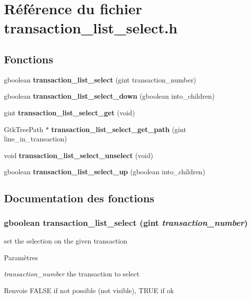 \section{Référence du fichier transaction\_\-list\_\-select.h}
\label{transaction__list__select_8h}
\subsection*{Fonctions}
\begin{DoxyCompactItemize}
\item 
gboolean {\bf transaction\_\-list\_\-select} (gint transaction\_\-number)
\item 
gboolean {\bf transaction\_\-list\_\-select\_\-down} (gboolean into\_\-children)
\item 
gint {\bf transaction\_\-list\_\-select\_\-get} (void)
\item 
GtkTreePath $\ast$ {\bf transaction\_\-list\_\-select\_\-get\_\-path} (gint line\_\-in\_\-transaction)
\item 
void {\bf transaction\_\-list\_\-select\_\-unselect} (void)
\item 
gboolean {\bf transaction\_\-list\_\-select\_\-up} (gboolean into\_\-children)
\end{DoxyCompactItemize}


\subsection{Documentation des fonctions}
\subsubsection[{transaction\_\-list\_\-select}]{\setlength{\rightskip}{0pt plus 5cm}gboolean transaction\_\-list\_\-select (gint {\em transaction\_\-number})}\label{transaction__list__select_8h_a85f38a439156b883335de73220dca237}
set the selection on the given transaction


\begin{DoxyParams}{Paramètres}
\item[{\em transaction\_\-number}]the transaction to select\end{DoxyParams}
\begin{DoxyReturn}{Renvoie}
FALSE if not possible (not visible), TRUE if ok 
\end{DoxyReturn}


